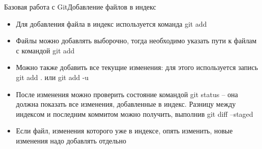 \begin{frame}{Базовая работа с Git}{Добавление файлов в индекс}
    \begin{itemize}
        \item
              Для добавления файла в индекс используется команда git add
        \item
              Файлы можно добавлять выборочно, тогда необходимо указать пути к файлам с командой git add
        \item
              Можно также добавить все текущие изменения: для этого используется запись git add . или git add -u
        \item
              После изменения можно проверить состояние командой git status -- она должна показать все изменения, добавленные в индекс. Разницу между индексом и последним коммитом можно получить, выполнив git diff --staged
        \item
              Если файл, изменения которого уже в индексе, опять изменить, новые изменения надо добавлять отдельно
    \end{itemize}
\end{frame}